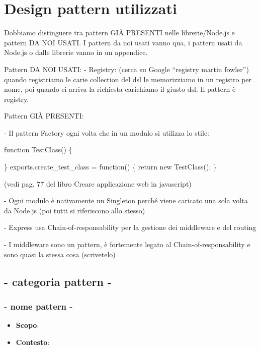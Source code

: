 \section{Design pattern utilizzati}

Dobbiamo distinguere tra pattern GIÀ PRESENTI nelle librerie/Node.js e pattern DA NOI USATI. I pattern da noi usati vanno qua, i pattern usati da Node.js o dalle librerie vanno in un appendice.


Pattern DA NOI USATI:
- Registry: (cerca su Google ``registry martin fowler'') quando registriamo le carie collection del dsl le memorizziamo in un registro per nome, poi quando ci arriva la richiesta carichiamo il giusto dsl. Il pattern è registry.


Pattern GIÀ PRESENTI:

- Il pattern Factory ogni volta che in un modulo si utilizza lo stile:

function TestClass() \{

\}
exports.create\_test\_class = function() \{
	return new TestClass();
\}

(vedi pag. 77 del libro Creare applicazione web in javascript)

- Ogni modulo è nativamente un Singleton perché viene caricato una sola volta da Node.js (poi tutti si riferiscono allo stesso)

- Express usa Chain-of-responsability per la gestione dei middleware e del routing

- I middleware sono un pattern, è fortemente legato al Chain-of-responsability e sono quasi la stessa cosa (scrivetelo)

\subsection{ - categoria pattern - }

\subsubsection{ - nome pattern - }

\begin{itemize}

	\item \textbf{Scopo}:
	\item \textbf{Contesto}:

\end{itemize}